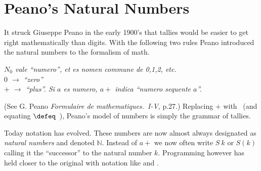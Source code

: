 \section{Peano's Natural Numbers}
It struck Giuseppe Peano in the early 1900's that tallies would be easier to get
right mathematically than digits. With the following two rules Peano introduced
the natural numbers to the formalism of math.
\begin{center}
\begin{minipage}{0.9\textwidth}
    \textit{
    $N_0$ vale ``numero'', et es nomen commune de 0,1,2, etc.\\
    $0$ $\to$  ``zero''\\
    $+$ $\to$ ``plus''.  Si $a$ es numero, $a+$ indica ``numero sequente $a$''.
    }
\end{minipage}
\end{center}
(See G. Peano \emph{Formulaire de mathematiques.~I-V}, p.27.)
Replacing $+$ with \StrokeOne ~(and equating \StrokeFive$\defeq$\StrokeFour~\StrokeOne),
Peano's model of numbers is simply the grammar of tallies.

Today notation has evolved.  These numbers are now almost always designated as
\emph{natural numbers} and denoted $\mathbb{N}$.  Instead of $a+$ we now often
write $S~k$  or $S(k)$ calling it the ``successor'' to the natural number $k$.  
Programming however has held closer to the original with notation like 
 and .

